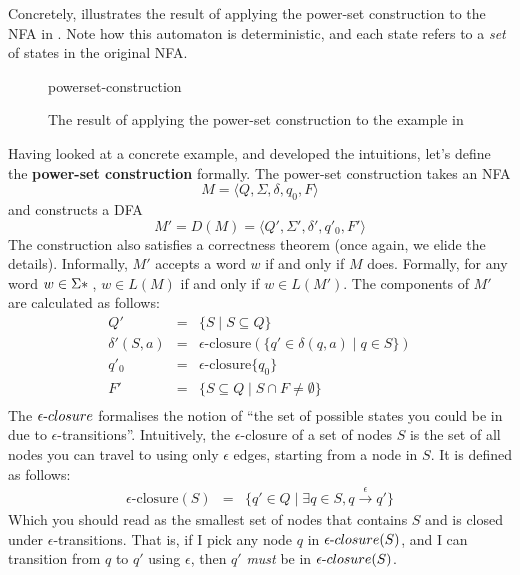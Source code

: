 Concretely,  illustrates the result of applying the power-set construction to the NFA in . Note how this automaton is deterministic, and each state refers to a \textit{set} of states in the original NFA.

\begin{figure}[H]
    \centering
    {powerset-construction}
    \caption{The result of applying the power-set construction to the example in }
    \label{fig:powerset-construction}
\end{figure}

Having looked at a concrete example, and developed the intuitions, let's define the \textbf{power-set construction} formally. The power-set construction takes an NFA
\[
M = \langle Q,\Sigma,\delta,q_0,F\rangle
\]
and constructs a DFA
\[
M' = D(M) = \langle Q',\Sigma',\delta',q'_0,F'\rangle
\]
The construction also satisfies a correctness theorem (once again, we elide the details). Informally, $M'$ accepts a word $w$ if and only if $M$ does. Formally, for any word $w \in \Sigma\*$, $w \in L(M)$ if and only if $w \in L(M')$. The components of $M'$ are calculated as follows:
\[
\begin{array}{rcl}
Q' &=& \{S \mid S \subseteq Q\}\\[1ex]
\delta'(S,a) &=& \epsilon\text{-closure}(\{q'\in\delta(q,a)\mid q \in S\})\\[1ex]
q'_0 &=& \epsilon\text{-closure}\{q_0\}\\[1ex]
F' &=& \{S \subseteq Q \mid S \cap F \neq \emptyset\}\\[1ex]
\end{array}
\]
The $\epsilon{\text-closure}$ formalises the notion of ``the set of possible states you could be in due to $\epsilon$-transitions''. Intuitively, the $\epsilon$-closure of a set of nodes $S$ is the set of all nodes you can travel to using only $\epsilon$ edges, starting from a node in $S$. It is defined as follows:
\[
\begin{array}{rcl}
\epsilon\text{-closure}(S) &=& \{q' \in Q \mid \exists q \in S, q \xrightarrow{\epsilon}q'\}
\end{array}
\]
Which you should read as the smallest set of nodes that contains $S$ and is closed under $\epsilon$-transitions. That is, if I pick any node $q$ in $\epsilon{\text-closure}(S)$, and I can transition from $q$ to $q'$ using $\epsilon$, then $q'$ \textit{must} be in $\epsilon{\text-closure}(S)$.

